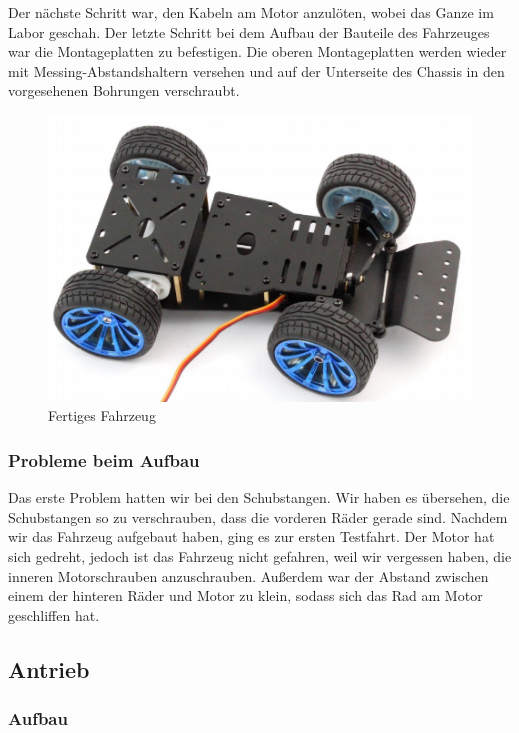        	Der nächste Schritt war, den Kabeln am Motor anzulöten, wobei das Ganze im Labor geschah. Der letzte Schritt bei dem Aufbau der Bauteile des Fahrzeuges war die Montageplatten zu befestigen. Die oberen Montageplatten werden wieder mit Messing-Abstandshaltern versehen und auf der Unterseite des Chassis in den vorgesehenen Bohrungen verschraubt.\\
        	
			\begin{figure}[H]
				\centering
				\includegraphics{img/Endergebnis.png}
				\caption{Fertiges Fahrzeug \cite{roboter-bausatz.de2WDRCSMART2020}}
				\label{fahrzeug}
			\end{figure}
        
        
        \subsubsection{Probleme beim Aufbau}
            Das erste Problem hatten wir bei den Schubstangen. Wir haben es übersehen, die Schubstangen so zu verschrauben, dass die vorderen Räder gerade sind. Nachdem wir das Fahrzeug aufgebaut haben, ging es zur ersten Testfahrt. Der Motor hat sich gedreht, jedoch ist das Fahrzeug nicht gefahren, weil wir vergessen haben, die inneren Motorschrauben anzuschrauben. Außerdem war der Abstand zwischen einem der hinteren Räder und Motor zu klein, sodass sich das Rad am Motor geschliffen hat.
            
	\subsection{Antrieb}
		
	\subsubsection{Aufbau}
		
